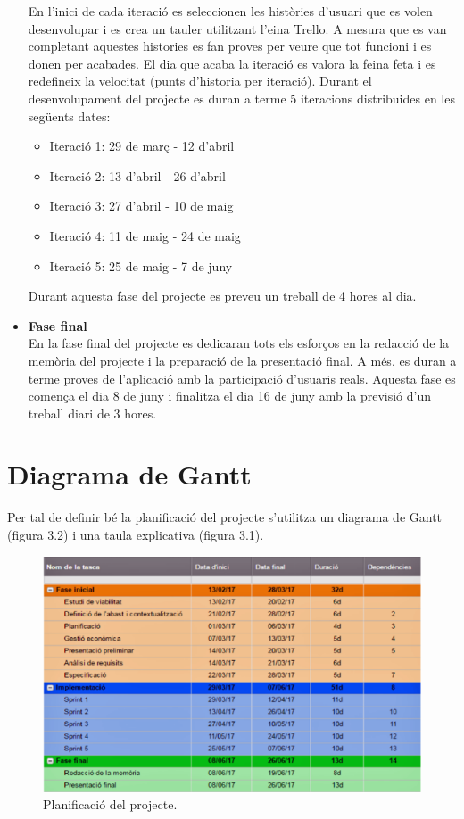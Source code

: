 \begin{itemize}
En l’inici de cada iteració es seleccionen les històries d’usuari que es volen desenvolupar i es crea un tauler utilitzant l’eina Trello. A mesura que es van completant aquestes histories es fan proves per veure que tot funcioni i es donen per acabades. El dia que acaba la iteració es valora la feina feta i es redefineix la velocitat (punts d’historia per iteració).
Durant el desenvolupament del projecte es duran a terme 5 iteracions distribuides en les següents dates:
\begin{itemize}
\item{}Iteració 1: 29 de març - 12 d’abril
\item{}Iteració 2: 13 d’abril - 26 d’abril
\item{}Iteració 3: 27 d’abril - 10 de maig
\item{}Iteració 4: 11 de maig - 24 de maig
\item{}Iteració 5: 25 de maig - 7 de juny
\end{itemize}
Durant aquesta fase del projecte es preveu un treball de 4 hores al dia.
\item{}\textbf{Fase final}\\
En la fase final del projecte es dedicaran tots els esforços en la redacció de
la memòria del projecte i la preparació de la presentació final. A més, es
duran a terme proves de l’aplicació amb la participació d’usuaris reals.
Aquesta fase es comença el dia 8 de juny i finalitza el dia 16 de juny amb
la previsió d’un treball diari de 3 hores.

\end{itemize}

\section{Diagrama de Gantt}

Per tal de definir bé la planificació del projecte s’utilitza un diagrama de Gantt (figura 3.2) i una taula explicativa (figura 3.1).

\begin{figure}[!h]
\centering
\includegraphics[scale=0.65]{Figures/planificacio.jpg}
\caption{Planificació del projecte.}
\end{figure}

